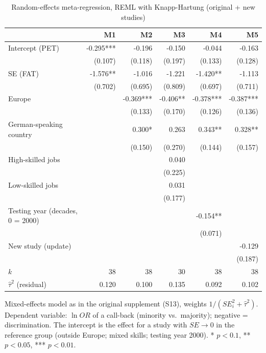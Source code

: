 \begin{table}[htbp]
\centering
\small
\caption{Random-effects meta-regression, REML with Knapp-Hartung (original + new studies)}
\label{tab:metareg-re}
\begin{tabular}{lrrrrr}
\toprule
 & M1 & M2 & M3 & M4 & M5 \\
\midrule
Intercept (PET) & -0.295*** & -0.196 & -0.150 & -0.044 & -0.163 \\
 & (0.107) & (0.118) & (0.197) & (0.133) & (0.128) \\
SE (FAT) & -1.576** & -1.016 & -1.221 & -1.420** & -1.113 \\
 & (0.702) & (0.695) & (0.809) & (0.697) & (0.711) \\
Europe &  & -0.369*** & -0.406** & -0.378*** & -0.387*** \\
 &  & (0.133) & (0.170) & (0.126) & (0.136) \\
German-speaking country &  & 0.300* & 0.263 & 0.343** & 0.328** \\
 &  & (0.150) & (0.270) & (0.144) & (0.157) \\
High-skilled jobs &  &  & 0.040 &  &  \\
 &  &  & (0.225) &  &  \\
Low-skilled jobs &  &  & 0.031 &  &  \\
 &  &  & (0.177) &  &  \\
Testing year (decades, 0 = 2000) &  &  &  & -0.154** &  \\
 &  &  &  & (0.071) &  \\
New study (update) &  &  &  &  & -0.129 \\
 &  &  &  &  & (0.187) \\
\midrule
$k$ & 38 & 38 & 30 & 38 & 38 \\
$\hat\tau^2$ (residual) & 0.120 & 0.100 & 0.135 & 0.092 & 0.102 \\
\bottomrule
\end{tabular}
\par\smallskip\parbox{0.95\linewidth}{\footnotesize Mixed-effects model as in the original supplement (S13), weights $1/(SE_i^2+\hat\tau^2)$. Dependent variable: $\ln OR$ of a call-back (minority vs.\ majority); negative = discrimination. The intercept is the effect for a study with $SE\to 0$ in the reference group (outside Europe; mixed skills; testing year 2000). * $p<0.1$, ** $p<0.05$, *** $p<0.01$.}
\end{table}
